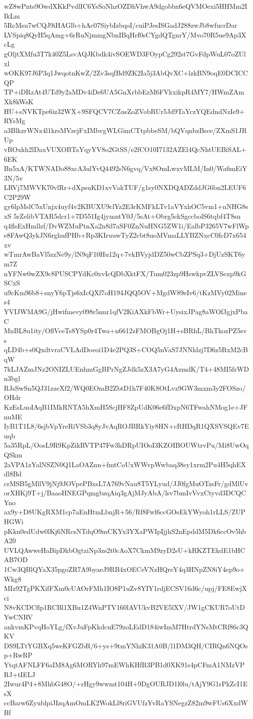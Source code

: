 wZ8wPnts9OwdXKkPvdlIC6YsSoNhzOZDhVhwA9dgobbx6eQVMOexi5HHMm2IIkLm
5RcMsu7wCQJ9iHAGlb+hAc07SiybIzbqoI/cuiPJesISGadJ288zwJb8wfucrDar
LVSpiq8QyH5qAmg+6rRuNjmmgNbnIBqHrf0sCYgdQTgnrY/Mvo70R5ue9Ap3XcLg
gOljtXMfu3T7k40Z5LsvAQJKbdk4ivSOEWD3FOypCg292st7GvFdpWuL07oZUlxl
wOKK97J6P3q1JwqotnKwZ/2Zv3sqfBd9ZK2Ia5j3AbQvXC+lzkBN9oqE0DCICCQP
TP+iDRzAt4UTd9y2aMDv4iDe6UA5GnXrbbEzM6FVkxikpR4MY7/HWmZAmXk8kWsK
HU+sNVKTpe6iz32WX+9SFQCV7CZusZoZVobRUr5Jd9TaYczYQEdndNzIe9+RYsMg
a3BlkzrWNx4l1krsMVzejFxIMbvgWLGimCTtpbbeSM/bQVqnbzBsce/ZXmS1JRUp
vROxkh2lDaxVUXOBTaYqyYV8o2GtSS/e2fCO10I7132AZEl4QcNhtUEBiSAL+6EK
Bn5xA/KTWNADo88xcA3ulYvQ4492sN6gvq/Vx8OmLwxvMLM/In0/Wa6mEiY3N/5v
LRVj7MWVK70vlRr+dXpsuKD1xvVakTUF/g1sy0NXDQADZddJG6bn2LEUF6C2P29W
gy6lpMslC5xUnjx4uyf4v2KBUXU9clYz2E3rKMFkLTv1aVYxhOC5vm1+nNHG8sxS
5rZelibVTAR5dcr1+7D551Ig4jymntY0J/5sAt+Obrg5ckSgccbolS6tqbf4T8sn
q4flsExHmllzf/DvWZMuPtnXa2n8il7aSF0ZnNuHNG5ZW1i/EalbP3265V7wFlWp
e8FAwQ3ykJN6rghufPHb+Rp3KIruuwTyZ2cbt8uoMVmaLLYBZNxcC0fcD7x654xv
wTmrAwBaVl5zzNe9y/lN9qF10Hu12q+7vkBVyjdDZ50wCbZPSq3+DjUzSKT6ym7Z
nYFNw0wZX9c8PUSCPYdKc0xvIcQDbXktFX/Tum023zp9HswkpvZLVSexp9kGSCxS
u9cKm96b8+snyY6pTjs6xIcQXf7oH194JQQ5OV+MgdW89eIv6/tKzMVy02Mines4
YVIJWMA9G/jHwifmevy098r5nnr1qfV2KiAXkFbWr+UysixJPag8aWOfJgjxPbaC
MnBL8u1ity/OflVceTs8YSp0r4Twa+n6612zFMOBgOj1H+sBRhL/BhTkozPZ5svs
qLD4b+s0QxdtvraCVLAdDoeoi1D4e2PQ3S+COQ5nVaS7JNNldzj7D6z5RxM2cBqW
7kLJAZmJNz2ONIZLUEnhmGgBPrNgZJdk5zX3A7yG4AzmdK/T4+48MI5frWDn3bgl
RJsSwSn5QJ31zzeXf2/WQ0EOmB2ZbtD1h7F40K8OtLvz9GW3mxm3y2FOSzo/OHdr
KzEsLuoIAqB1IMkRNTA5hXmH5ScjHF8ZpUdK06e6fDxpN6TFwahNMog1e+JFnuME
IyB1T1L8/6sjbVpYreRiVSb3q8yJvAqROJBRkYiy8HN+cRHDqR1QXSVSQEv7Euqb
5a35RpL/OosL9R9KpZikRVTP47Fw3hDRpUIOoI3KZOIBOUWtrvPu/Mi8UwOqQSkm
2aVPA1zYalNSZN0Q1LaOAZnn+fmtCoUxWWvpWwbaq38sy1xrm2Pu4H5qhEXdl8Bd
crMSB5gMllV9jNj9JOVpePBxsL7A769vNau8T5YLyud/JJ0fgMuOTzsFr/gdMlUv
orXHKj9T+j/BaaoHNEGPqmgbzqAiq3gAjMJyAbA/lsv7bmIvVvxCtyvd3DCQCYno
ax9y+D8UKgRXM1cp7aEnHtmLbnjR+56/Rf8Fwl6ccGOsEkYWyoh1rLLS/ZUPHGWi
pKkn0edUdw0lKj6NRcsNTdqO9mCKYx3YXaPWIpIjjhS2nEpddM5Dk6ccOv5hbA20
UVLQAwweHaBipDkbOgtziNp3zs2t0cAoX7CkmM9zyD2sU+kRKZTEkdE1bHCAB7OD
1Cw3QBlQYaX35pgoZR7A9byaeJ9RB4xOECeVNzHQreY4q3HNpZN8iY4ep9o+Wkg8
MIz92TgPKXifFXm0cUAOrFMh1IO8P1uZv8YIY1rdjECSV16d6c/upj/FE8EwjXci
N8vKCDCflp1RCBl1XBu1Z4WnPTV160lAVUkvB2VE5lXV/JW1gCKUR7oUtDYwCNRV
ankvmKPvqHoYLg/fXvJuFpKkdcuE79zoLEdD184iwImM7HtrdYNsMtCRf86c3QKV
DS9LTtYGBXq5weKFGZbR/6+ys+9tmYNhiK31A0B/l1DM3QH/CIRQn6NQOsp+RwRP
YtqtAFNLFF6aIM8Ag6MORYh97mEWhKHfR3PB1d0XK91s4pCFmA1NMzVPRJ+tIELJ
2Iwur4P4+8MhbG48O/+rHgy9wwmt104H+9DgOURJD1l0lu/tAjY9G1rPkZcI1EsX
ccBarw6ZyublpiJIzqAmOmLK2WokLl8riGVUfzYvRaYSNegzZ82m9wFUs6XxdWBf
